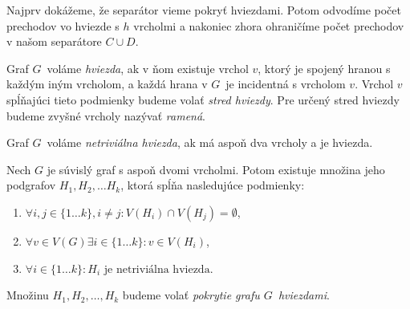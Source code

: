 Najprv dokážeme, že separátor vieme pokryť hviezdami. Potom odvodíme počet prechodov vo hviezde
s $h$ vrcholmi a nakoniec zhora ohraničíme počet prechodov v našom separátore $C \cup D$.

\begin{defn}
    Graf $G$ voláme \emph{hviezda}, ak v ňom existuje vrchol $v$, ktorý je spojený hranou s každým iným
    vrcholom, a každá hrana v $G$ je incidentná s vrcholom $v$. Vrchol $v$ spĺňajúci tieto podmienky
    budeme volať \emph{stred hviezdy}. Pre určený stred hviezdy budeme zvyšné vrcholy nazývať \emph{ramená}.

    Graf $G$ voláme \emph{netriviálna hviezda}, ak má aspoň dva vrcholy a je hviezda.
\end{defn}

\begin{lema}
    Nech $G$ je súvislý graf s aspoň dvomi vrcholmi. Potom existuje množina jeho podgrafov
    $H_1, H_2, \ldots H_k$, ktorá spĺňa nasledujúce podmienky:
    \begin{enumerate}
        \item $\forall i, j \in \{1 \ldots k\}, i \neq j: V(H_i) \cap V(H_j) = \emptyset$,
        \item $\forall v \in V(G) \exists i \in \{1 \ldots k\}: v \in V(H_i)$,
        \item $\forall i \in \{1 \ldots k\}: H_i \textrm{ je netriviálna hviezda}$.
    \end{enumerate}

    Množinu $H_1, H_2, \ldots, H_k$ budeme volať \emph{pokrytie grafu $G$ hviezdami}.
\end{lema}

